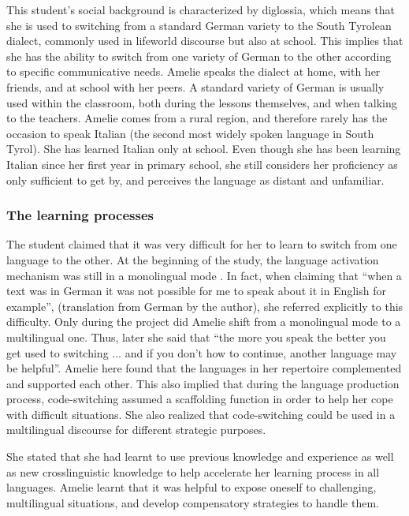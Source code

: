 \documentclass[output=paper]{../langscibook}
\begin{document}
This student’s social background is characterized by diglossia, which means that she is used to switching from a standard German variety to the South Tyrolean dialect, commonly used in lifeworld discourse but also at school. This implies that she has the ability to switch from one variety of German to the other according to specific communicative needs. Amelie speaks the dialect at home, with her friends, and at school with her peers. A standard variety of German is usually used within the classroom, both during the lessons themselves, and when talking to the teachers. Amelie comes from a rural region, and therefore rarely has the occasion to speak Italian (the second most widely spoken language in South Tyrol). She has learned Italian only at school. Even though she has been learning Italian since her first year in primary school, she still considers her proficiency as only sufficient to get by, and perceives the language as distant and unfamiliar.


\subsubsection{The learning processes}

The student claimed that it was very difficult for her to learn to switch from one language to the other. At the beginning of the study, the language activation mechanism was still in a monolingual mode \citep{Grosjean2007}. In fact, when claiming that “when a text was in German it was not possible for me to speak about it in English for example”, (translation from German by the author), she referred explicitly to this difficulty. Only during the project did Amelie shift from a monolingual mode to a multilingual one. Thus, later she said that “the more you speak the better you get used to switching ... and if you don’t how to continue, another language may be helpful”. Amelie here found that the languages in her repertoire complemented and supported each other. This also implied that during the language production process, code-switching assumed a scaffolding function in order to help her cope with difficult situations. She also realized that code-switching could be used in a multilingual discourse for different strategic purposes.

She stated that she had learnt to use previous knowledge and experience as well as new crosslinguistic knowledge to help accelerate her learning process in all languages. Amelie learnt that it was helpful to expose oneself to challenging, multilingual situations, and develop compensatory strategies to handle them. 
\end{document}
